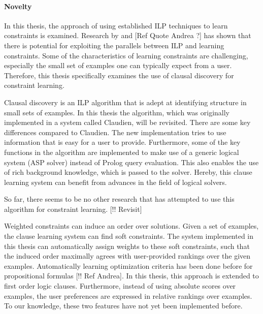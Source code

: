 \paragraph{Novelty}
In this thesis, the approach of using established ILP techniques to learn constraints is examined. Research by \cite{Lallouet:LearningCP} and [Ref Quote Andrea ?] has shown that there is potential for exploiting the parallels between ILP and learning constraints. Some of the characteristics of learning constraints are challenging, especially the small set of examples one can typically expect from a user. Therefore, this thesis specifically examines the use of clausal discovery for constraint learning.

Clausal discovery is an ILP algorithm that is adept at identifying structure in small sets of examples. In this thesis the algorithm, which was originally implemented in a system called Claudien, will be revisited. There are some key differences compared to Claudien. The new implementation tries to use information that is easy for a user to provide. Furthermore, some of the key functions in the algorithm are implemented to make use of a generic logical system (ASP solver) instead of Prolog query evaluation. This also enables the use of rich background knowledge, which is passed to the solver. Hereby, this clause learning system can benefit from advances in the field of logical solvers.

So far, there seems to be no other research that has attempted to use this algorithm for constraint learning. [!! Revisit]

Weighted constraints can induce an order over solutions. Given a set of examples, the clause learning system can find soft constraints. The system implemented in this thesis can automatically assign weights to these soft constraints, such that the induced order maximally agrees with user-provided rankings over the given examples. Automatically learning optimization criteria has been done before for propositional formulas [!! Ref Andrea]. In this thesis, this approach is extended to first order logic clauses. Furthermore, instead of using absolute scores over examples, the user preferences are expressed in relative rankings over examples. To our knowledge, these two features have not yet been implemented before.